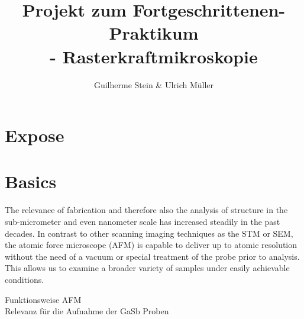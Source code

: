 \documentclass[paper=a4,fontsize=10pt,DIV=18,twocolumn,parskip=half]{scrartcl}
\numberwithin{equation}{section}    %
\begin{document}
\title{Projekt zum Fortgeschrittenen-Praktikum \\ - Rasterkraftmikroskopie}                  
\author{Guilherme Stein \& Ulrich Müller}         
\date{}                                %
\addtocounter{section}{-1}
\section{Expose}

\label{Expose}
\newpage

\section{Basics}
The relevance of fabrication and therefore also the analysis of structure in the 
sub-micrometer and even nanometer scale has increased steadily in the past 
decades. In contrast to other scanning imaging techniques as the STM or SEM, the 
atomic force microscope (AFM) is capable to deliver up to atomic resolution 
without the need of a vacuum or special treatment of the probe prior to 
analysis. This allows us to examine a broader variety of samples under easily 
achievable conditions.  

Funktionsweise AFM\\
Relevanz für die Aufnahme der GaSb Proben\\
\end{document}
